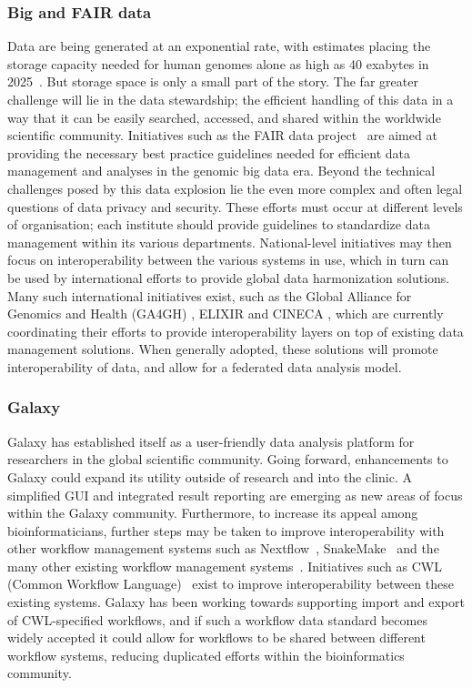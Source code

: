 \subsubsection{Big and FAIR data}
Data are being generated at an exponential rate, with estimates placing the storage capacity needed for human genomes alone as high as 40 exabytes in 2025~\cite{stephens2015}.
But storage space is only a small part of the story. The far greater challenge will lie in the data stewardship; the efficient handling of this data in a way that it can be easily searched, accessed, and shared within the worldwide scientific community.
Initiatives such as the FAIR data project~\cite{wilkinson2016fair} are aimed at providing the necessary best practice guidelines needed for efficient data management and analyses in the genomic big data era. Beyond the technical challenges posed by this data explosion lie the even more complex and often legal questions of data privacy and security.
These efforts must occur at different levels of organisation; each institute should provide guidelines to standardize data management within its various departments. National-level initiatives may then focus on interoperability between the various systems in use, which in turn can be used by international efforts to provide global data harmonization solutions.
Many such international initiatives exist, such as the Global Alliance for Genomics and Health (GA4GH) \cite{ga4gh}, ELIXIR \cite{elixir} and CINECA \cite{cineca}, which are currently coordinating their efforts to provide interoperability layers on top of existing data management solutions.
When generally adopted, these solutions will promote interoperability of data, and allow for a federated data analysis model.


\subsubsection{Galaxy}
Galaxy has established itself as a user-friendly data analysis platform for researchers in the global scientific community. Going forward, enhancements to Galaxy could expand its utility outside of research and into the clinic. A simplified GUI and integrated result reporting are emerging as new areas of focus within the Galaxy community.
Furthermore, to increase its appeal among bioinformaticians, further steps may be taken to improve interoperability with other workflow management systems such as Nextflow~\cite{di2017nextflow}, SnakeMake~\cite{koster2012snakemake} and the many other existing workflow management systems~\cite{workflow-engines}.
Initiatives such as CWL (Common Workflow Language)~\cite{amstutz2016common} exist to improve interoperability between these existing systems. Galaxy has been working towards supporting import and export of CWL-specified workflows, and if such a workflow data standard becomes widely accepted it could allow for workflows to be shared between different workflow systems, reducing duplicated efforts within the bioinformatics community.

